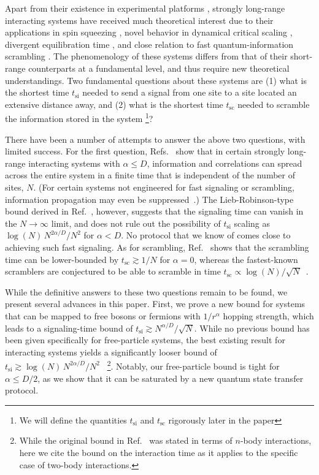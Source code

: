 Apart from their existence in experimental platforms \cite{Monroe13, Britton12, Blatt12,Yan13,Lukin17}, strongly long-range interacting systems have received much theoretical interest due to their applications in spin squeezing \cite{FossFeig16}, novel behavior in dynamical critical scaling \cite{Defenu18,Acevedo14}, divergent equilibration time \cite{Kastner11}, and close relation to fast quantum-information scrambling \cite{SY93,Bollinger17, Kitaev15, Maldacena16, SS08,Lucas18,Lucas19}. The phenomenology of these systems differs from that of their short-range counterparts at a fundamental level, and thus require new theoretical understandings.
Two fundamental questions about these systems are (1) what is the shortest time $t_{\text{si}}$ needed to send a signal from one site to a site located an extensive distance away, and (2) what is the shortest time $t_{\text{sc}}$ needed to scramble the information stored in the system \footnote{We will define the quantities $t_{\text{si}}$ and $t_{\text{sc}}$ rigorously later in the paper}?

There have been a number of attempts to answer the above two questions, with limited success.
For the first question, Refs.~\cite{Eisert13,Hauke13,Eldredge17} show that in certain strongly long-range interacting systems with $\alpha\le D$, information and correlations can spread across the entire system in a finite time that is independent of the number of sites, $N$.
(For certain systems not engineered for fast signaling or scrambling, information propagation may even be suppressed~\cite{Santos16}.)
The Lieb-Robinson-type bound derived in Ref.~\cite{Storch15}, however, suggests that the signaling time can vanish in the $N\rightarrow\infty$ limit, and does not rule out the possibility of $t_\text{si}$ scaling as $\log(N)\,N^{2\alpha/D}/N^2$ for $\alpha < D$.
No protocol that we know of comes close to achieving such fast signaling.
As for scrambling, Ref.~\cite{Lashkari13} shows that the scrambling time can be lower-bounded by  $t_\text{sc} \gtrsim 1/N$ for $\alpha=0$, whereas the fastest-known scramblers are conjectured to be able to scramble in time $t_\text{sc} \propto \log(N)/\sqrt{N}$\ \cite{SS08}.

While the definitive answers to these two questions remain to be found, we present several advances in this paper.
First, we prove a new bound for systems that can be mapped to free bosons or fermions with $1/r^{\alpha}$ hopping strength, which leads to a signaling-time bound of $t_\text{si} \gtrsim N^{\alpha/D}/\sqrt{N}$.
While no previous bound has been given specifically for free-particle systems, the best existing result for interacting systems yields a significantly looser bound of $t_\text{si} \gtrsim \log(N)\,N^{2\alpha/D}/N^2$~\cite{Storch15}
\footnote{While the original bound in Ref.~\cite{Storch15} was stated in terms of $n$-body interactions, here we cite the bound on the interaction time as it applies to the specific case of two-body interactions.}.
Notably, our free-particle bound is tight for $\alpha\le D/2$, as we show that it can be saturated by a new quantum state transfer protocol.


